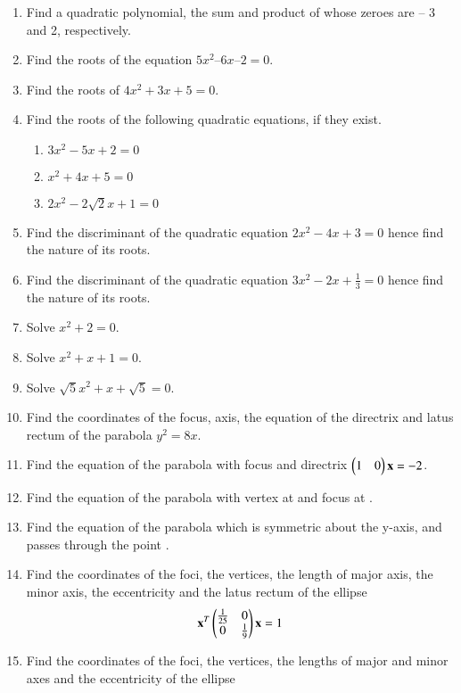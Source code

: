\begin{enumerate}[label=\arabic*.,ref=\thesubsection.\theenumi]
\item Find a quadratic polynomial, the sum and product of whose zeroes are – 3 and 2, respectively.
%
\item Find the roots of the equation $5x^2  – 6x – 2 = 0 $.
\item Find the roots of $4x^2 + 3x + 5 = 0 $.
\item Find the roots of the following quadratic equations, if they exist.
\begin{enumerate}
\item 	$3x^2-5x+2 = 0$
\item 	$x^2+4x+5 = 0$
\item 	$2x^2-2\sqrt{2}x+1 = 0$
\end{enumerate}
%
\item Find the discriminant of the quadratic equation $2x^2-4x+3 = 0$
hence find the nature of its roots.
\item Find the discriminant of the quadratic equation $3x^2-2x+\frac{1}{3} = 0$
hence find the nature of its roots.
\item Solve $x^2+ 2 = 0 $.
\item Solve $x^2+ x+1 = 0 $.
\item Solve $\sqrt{5}x^2+ x+\sqrt{5} = 0 $.
%
\item Find the coordinates of the focus, axis, the equation of the directrix and latus rectum of the parabola $y^2 = 8x$.
%
\item Find the equation of the parabola with focus  and directrix $\begin{pmatrix}1 & 0\end{pmatrix}\mathbf{x} = -2$.\item Find the equation of the parabola with vertex at  and focus at .
\item Find the equation of the parabola which is symmetric about the y-axis, and passes through the point .
\item Find the coordinates of the foci, the vertices, the length of major axis, the minor axis, the eccentricity and the latus rectum of the ellipse 
%
\begin{align}
\mathbf{x}^T\begin{pmatrix}\frac{1}{25} & 0 \\ 0 & \frac{1}{9}\end{pmatrix}\mathbf{x} = 1
\end{align}
%
\item Find the coordinates of the foci, the vertices, the lengths of major and minor axes and the eccentricity of the ellipse 

\end{enumerate}
